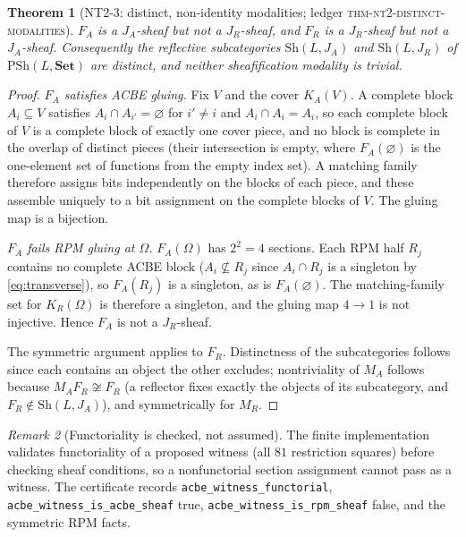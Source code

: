 \documentclass[11pt]{amsart}
\newtheorem{theorem}{Theorem}[section]
\theoremstyle{definition}
\theoremstyle{remark}
\newtheorem{remark}[theorem]{Remark}
\newcommand{\PSh}{\mathrm{PSh}}
\newcommand{\Sh}{\mathrm{Sh}}
\newcommand{\Set}{\mathbf{Set}}
\begin{document}
\begin{theorem}[NT2-3: distinct, non-identity modalities; \textnormal{ledger \textsc{thm-nt2-distinct-modalities}}]\label{thm:nt2-3}
$F_A$ is a $J_A$-sheaf but not a $J_R$-sheaf, and $F_R$ is a $J_R$-sheaf but not a $J_A$-sheaf. Consequently the reflective subcategories $\Sh(L,J_A)$ and $\Sh(L,J_R)$ of $\PSh(L,\Set)$ are distinct, and neither sheafification modality is trivial.
\end{theorem}

\begin{proof}
\emph{$F_A$ satisfies ACBE gluing.} Fix $V$ and the cover $K_A(V)$. A complete block $A_i\subseteq V$ satisfies $A_i\cap A_{i'}=\varnothing$ for $i'\neq i$ and $A_i\cap A_i=A_i$, so each complete block of $V$ is a complete block of exactly one cover piece, and no block is complete in the overlap of distinct pieces (their intersection is empty, where $F_A(\varnothing)$ is the one-element set of functions from the empty index set). A matching family therefore assigns bits independently on the blocks of each piece, and these assemble uniquely to a bit assignment on the complete blocks of $V$. The gluing map is a bijection.

\emph{$F_A$ fails RPM gluing at $\Omega$.} $F_A(\Omega)$ has $2^2=4$ sections. Each RPM half $R_j$ contains no complete ACBE block ($A_i\not\subseteq R_j$ since $A_i\cap R_j$ is a singleton by \eqref{eq:transverse}), so $F_A(R_j)$ is a singleton, as is $F_A(\varnothing)$. The matching-family set for $K_R(\Omega)$ is therefore a singleton, and the gluing map $4\to 1$ is not injective. Hence $F_A$ is not a $J_R$-sheaf.

The symmetric argument applies to $F_R$. Distinctness of the subcategories follows since each contains an object the other excludes; nontriviality of $M_A$ follows because $M_A F_R\not\cong F_R$ (a reflector fixes exactly the objects of its subcategory, and $F_R\notin\Sh(L,J_A)$), and symmetrically for $M_R$.
\end{proof}

\begin{remark}[Functoriality is checked, not assumed]
The finite implementation validates functoriality of a proposed witness (all $81$ restriction squares) before checking sheaf conditions, so a nonfunctorial section assignment cannot pass as a witness. The certificate records \texttt{acbe\_witness\_functorial}, \texttt{acbe\_witness\_is\_acbe\_sheaf} true, \texttt{acbe\_witness\_is\_rpm\_sheaf} false, and the symmetric RPM facts.
\end{remark}
\end{document}
